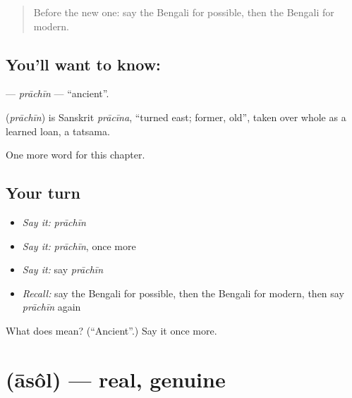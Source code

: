 \label{lesson:BN-C191-prachin}



\begin{quote}
Before the new one: say the Bengali for possible, then the Bengali for modern.
\end{quote}

\subsection*{You'll want to know: }
\textbf{} — \emph{prāchīn} — \textquotedblleft{}ancient\textquotedblright{}.

\begin{cousinweb}
\textbf{} (\emph{prāchīn}) is Sanskrit \emph{prācīna}, \textquotedblleft{}turned east; former, old\textquotedblright{}, taken over whole as a learned loan, a tatsama.
\end{cousinweb}

\begin{grammarlens}[title={What you've built}]
One more word for this chapter.
\end{grammarlens}

\subsection*{Your turn}
\begin{itemize}
\raggedright
  \item \emph{Say it:} \emph{prāchīn}
  \item \emph{Say it:} \emph{prāchīn}, once more
  \item \emph{Say it:} say \emph{prāchīn}
  \item \emph{Recall:} say the Bengali for possible, then the Bengali for modern, then say \emph{prāchīn} again
\end{itemize}

\begin{tcolorbox}[breakable,colback=teal!4,colframe=teal!35!black,title={Before you move on}]
What does  mean? (\textquotedblleft{}Ancient\textquotedblright{}.) Say it once more.
\end{tcolorbox}
\section[\texorpdfstring{\bn{আসল} (āsôl)}{আসল (āsôl)}]{ (āsôl) — real, genuine}

\label{lesson:BN-C191-asol}



